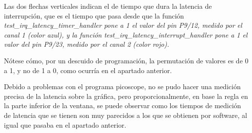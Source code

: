 \documentclass[../main.tex]{subfiles}
\begin{document}
Las dos flechas verticales indican el de tiempo que dura la latencia de interrupción, que es el tiempo que pasa desde que la función \it{test\_irq\_latency\_timer\_handler} pone a 1 el valor del pin P9/12, medido por el canal 1 (color azul), y la función \it{test\_irq\_latency\_interrupt\_handler} pone a 1 el valor del pin P9/23, medido por el canal 2 (color rojo).

Nótese cómo, por un descuido de programación, la permutación de valores es de 0 a 1, y no de 1 a 0, como ocurría en el apartado anterior. 

Debido a problemas con el programa picoscope, no se pudo hacer una medición precisa de la latencia sobre la gráfica, pero proporcionalmente, en base la regla en la parte inferior de la ventana, se puede observar como los tiempos de medición de latencia que se tienen son muy parecidos a los que se obtienen por software, al igual que pasaba en el apartado anterior.
\end{document}
